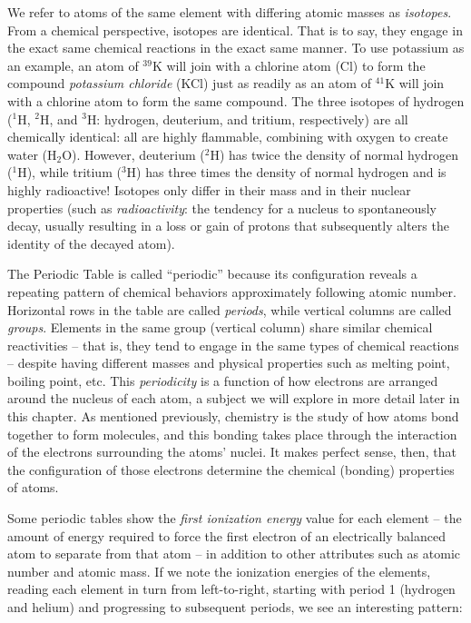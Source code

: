 We refer to atoms of the same element with differing atomic masses as \textit{isotopes}.  From a chemical perspective, isotopes are identical.  That is to say, they engage in the exact same chemical reactions in the exact same manner.  To use potassium as an example, an atom of $^{39}$K will join with a chlorine atom (Cl) to form the compound \textit{potassium chloride} (KCl) just as readily as an atom of $^{41}$K will join with a chlorine atom to form the same compound.  The three isotopes of hydrogen ($^{1}$H, $^{2}$H, and $^{3}$H: hydrogen, deuterium, and tritium, respectively) are all chemically identical: all are highly flammable, combining with oxygen to create water (H$_{2}$O).  However, deuterium ($^{2}$H) has twice the density of normal hydrogen ($^{1}$H), while tritium ($^{3}$H) has three times the density of normal hydrogen and is highly radioactive!  Isotopes only differ in their mass and in their nuclear properties (such as \textit{radioactivity}: the tendency for a nucleus to spontaneously decay, usually resulting in a loss or gain of protons that subsequently alters the identity of the decayed atom).   

\vskip 10pt

The Periodic Table is called ``periodic'' because its configuration reveals a repeating pattern of chemical behaviors approximately following atomic number.  Horizontal rows in the table are called \textit{periods}, while vertical columns are called \textit{groups}.  Elements in the same group (vertical column) share similar chemical reactivities -- that is, they tend to engage in the same types of chemical reactions -- despite having different masses and physical properties such as melting point, boiling point, etc.  This \textit{periodicity} is a function of how electrons are arranged around the nucleus of each atom, a subject we will explore in more detail later in this chapter.  As mentioned previously, chemistry is the study of how atoms bond together to form molecules, and this bonding takes place through the interaction of the electrons surrounding the atoms' nuclei.  It makes perfect sense, then, that the configuration of those electrons determine the chemical (bonding) properties of atoms.

\filbreak

Some periodic tables show the \textit{first ionization energy} value for each element -- the amount of energy required to force the first electron of an electrically balanced atom to separate from that atom -- in addition to other attributes such as atomic number and atomic mass.  If we note the ionization energies of the elements, reading each element in turn from left-to-right, starting with period 1 (hydrogen and helium) and progressing to subsequent periods, we see an interesting pattern:

